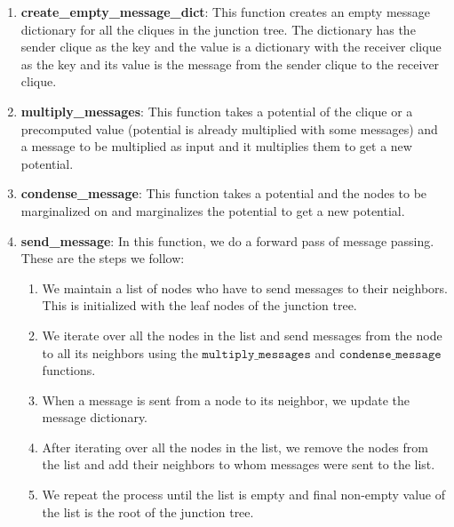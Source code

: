 \documentclass[12pt]{article}
\begin{document}
\begin{enumerate}
    \item \textbf{create\_empty\_message\_dict}: This function creates an empty message dictionary for all the cliques in the junction tree. The dictionary has the sender clique as the key and the value is a dictionary with the receiver clique as the key and its value is the message from the sender clique to the receiver clique.
    
    \item \textbf{multiply\_messages}: This function takes a potential of the clique or a precomputed value (potential is already multiplied with some messages) and a message to be multiplied as input and it multiplies them to get a new potential.
    
    \item \textbf{condense\_message}: This function takes a potential and the nodes to be marginalized on and marginalizes the potential to get a new potential.
    
    \item \textbf{send\_message}: In this function, we do a forward pass of message passing. These are the steps we follow:
        \begin{enumerate}
            \item We maintain a list of nodes who have to send messages to their neighbors. This is initialized with the leaf nodes of the junction tree.
            \item We iterate over all the nodes in the list and send messages from the node to all its neighbors using the $\texttt{multiply\_messages}$ and $\texttt{condense\_message}$ functions.
            \item When a message is sent from a node to its neighbor, we update the message dictionary.
            \item After iterating over all the nodes in the list, we remove the nodes from the list and add their neighbors to whom messages were sent to the list.
            \item We repeat the process until the list is empty and final non-empty value of the list is the root of the junction tree.
        \end{enumerate}
    

\end{enumerate}
\end{document}
